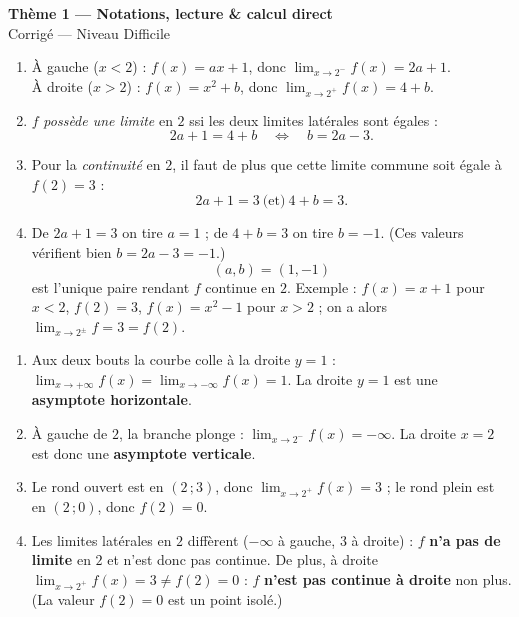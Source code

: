 \documentclass[11pt,a4paper]{article}
\begin{document}
\begin{center}
{\Large\bfseries\color{primarydark}Thème 1 — Notations, lecture \& calcul direct}\\[2pt]
{\large\color{excol}Corrigé — Niveau Difficile}
\end{center}
\vspace{6pt}

\begin{correction}
\begin{enumerate}[label=\alph*),leftmargin=2em,itemsep=3pt]
  \item À gauche ($x<2$) : $f(x)=ax+1$, donc $\displaystyle\lim_{x\to 2^{-}} f(x)=2a+1$.\\
        À droite ($x>2$) : $f(x)=x^2+b$, donc $\displaystyle\lim_{x\to 2^{+}} f(x)=4+b$.
  \item $f$ \emph{possède une limite} en $2$ ssi les deux limites latérales sont égales :
        \[ 2a+1=4+b\quad\Longleftrightarrow\quad \boxed{b=2a-3}. \]
  \item Pour la \emph{continuité} en $2$, il faut de plus que cette limite commune soit égale à $f(2)=3$ :
        \[ 2a+1=3\ \text{(et)}\ 4+b=3. \]
  \item De $2a+1=3$ on tire $a=1$ ; de $4+b=3$ on tire $b=-1$. (Ces valeurs vérifient bien $b=2a-3=-1$.)
        \[ \boxed{(a,b)=(1,-1)} \]
        est l'unique paire rendant $f$ continue en $2$. Exemple : $f(x)=x+1$ pour $x<2$, $f(2)=3$,
        $f(x)=x^2-1$ pour $x>2$ ; on a alors $\lim_{x\to2^\pm} f=3=f(2)$.
\end{enumerate}
\end{correction}

\begin{correction}
\begin{enumerate}[label=\alph*),leftmargin=2em,itemsep=3pt]
  \item Aux deux bouts la courbe colle à la droite $y=1$ :
        $\displaystyle\lim_{x\to +\infty} f(x)=\lim_{x\to -\infty} f(x)=1$. La droite $y=1$ est une
        \textbf{asymptote horizontale}.
  \item À gauche de $2$, la branche plonge : $\displaystyle\lim_{x\to 2^{-}} f(x)=-\infty$. La droite
        $x=2$ est donc une \textbf{asymptote verticale}.
  \item Le rond ouvert est en $(2\,;3)$, donc $\displaystyle\lim_{x\to 2^{+}} f(x)=3$ ; le rond plein est
        en $(2\,;0)$, donc $f(2)=0$.
  \item Les limites latérales en $2$ diffèrent ($-\infty$ à gauche, $3$ à droite) : $f$ \textbf{n'a pas de
        limite} en $2$ et n'est donc pas continue. De plus, à droite $\lim_{x\to 2^{+}} f(x)=3\neq f(2)=0$ :
        $f$ \textbf{n'est pas continue à droite} non plus. (La valeur $f(2)=0$ est un point isolé.)
\end{enumerate}
\end{correction}
\end{document}
